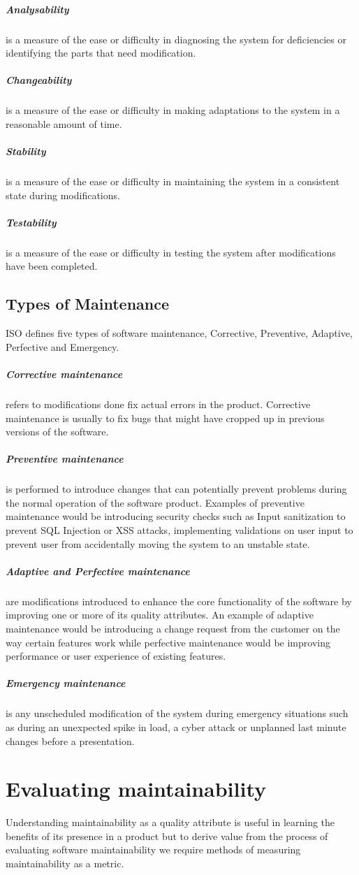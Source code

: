 \documentclass[15pt]{article}
\begin{document}
\subparagraph{Analysability} is a measure of the ease or difficulty in diagnosing the system for deficiencies or identifying the parts that need modification.

\subparagraph{Changeability} is a measure of the ease or difficulty in making adaptations to the system in a reasonable amount of time.

\subparagraph{Stability} is a measure of the ease or difficulty in maintaining the system in a consistent state during modifications.

\subparagraph{Testability} is a measure of the ease or difficulty in testing the system after modifications have been completed.

\subsection{Types of Maintenance}
ISO defines five types of software maintenance, Corrective, Preventive, Adaptive, Perfective and Emergency. \\

\subparagraph{Corrective maintenance} refers to modifications done fix actual errors in the product. Corrective maintenance is usually to fix bugs that might have cropped up in previous versions of the software. 

\subparagraph{Preventive maintenance} is performed to introduce changes that can potentially prevent problems during the normal operation of the software product. Examples of preventive maintenance would be introducing security checks such as Input sanitization to prevent SQL Injection or XSS attacks, implementing validations on user input to prevent user from accidentally moving the system to an unstable state. 

\subparagraph{Adaptive and Perfective maintenance} are modifications introduced to enhance the core functionality of the software by improving one or more of its quality attributes. An example of adaptive maintenance would be introducing a change request from the customer on the way certain features work while perfective maintenance would be improving performance or user experience of existing features.

\subparagraph{Emergency maintenance} is any unscheduled modification of the system during emergency situations such as during an unexpected spike in load, a cyber attack or unplanned last minute changes before a presentation.

\section{Evaluating maintainability}
Understanding maintainability as a quality attribute is useful in learning the benefits of its presence in a product but to derive value from the process of evaluating software maintainability we require methods of measuring maintainability as a metric.
\end{document}
